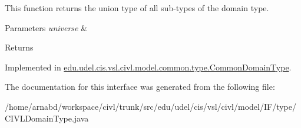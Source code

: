 This function returns the union type of all sub-\/types of the domain type.


\begin{DoxyParams}{Parameters}
{\em universe} & \\
\hline
\end{DoxyParams}
\begin{DoxyReturn}{Returns}

\end{DoxyReturn}


Implemented in \hyperlink{classedu_1_1udel_1_1cis_1_1vsl_1_1civl_1_1model_1_1common_1_1type_1_1CommonDomainType_a566023f7060c57a8a9d6201e487ca848}{edu.\+udel.\+cis.\+vsl.\+civl.\+model.\+common.\+type.\+Common\+Domain\+Type}.



The documentation for this interface was generated from the following file\+:\begin{DoxyCompactItemize}
\item 
/home/arnabd/workspace/civl/trunk/src/edu/udel/cis/vsl/civl/model/\+I\+F/type/C\+I\+V\+L\+Domain\+Type.\+java\end{DoxyCompactItemize}
